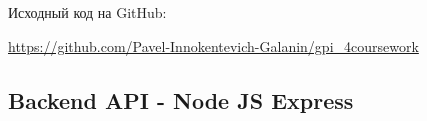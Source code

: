 \documentclass[12pt, a4paper, simple]{eskdtext}
\begin{document}
    
    
    Исходный код на GitHub:
    
    \url{https://github.com/Pavel-Innokentevich-Galanin/gpi_4coursework}
    
    \subsection*{Backend API - Node JS Express}
    
    
    
    
    
    
    
    
    
    \newpage


\end{document}
